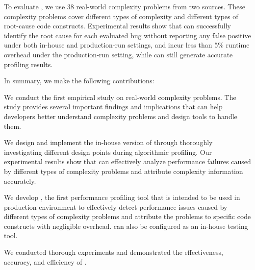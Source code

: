 To evaluate \Tool, we use 38 real-world complexity problems from two sources.
These complexity problems cover different types of 
complexity and different types of root-cause code constructs. 
Experimental results show that \Tool can successfully identify the 
root cause for each evaluated bug without reporting 
any false positive under both in-house and production-run settings, 
and incur less than 5\% runtime overhead under the production-run setting, 
while can still generate accurate profiling results.  


In summary, we make the following contributions:

\begin{itemize*}

\item We conduct the first empirical study on real-world complexity problems.
The study provides several important findings and implications that can
help developers better understand complexity problems and design tools
to handle them. 


\item We design and implement the in-house version of \Tool through
thoroughly investigating different design points during algorithmic profiling.
Our experimental results show that \Tool can effectively analyze performance failures
caused by different types of complexity problems and attribute complexity information accurately.

\fi

\item We develop   \Tool, the first performance profiling tool that is intended to be used
in production environment to effectively detect performance
issues caused by different types of complexity problems and attribute the 
problems to specific code constructs with negligible
overhead.  
\Tool can also be configured as an in-house testing tool. 

\item We conducted thorough experiments and demonstrated the effectiveness, accuracy, and efficiency of \Tool. 




\end{itemize*}
